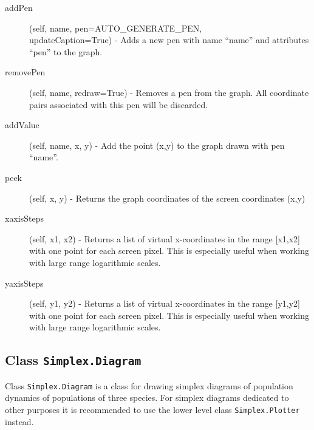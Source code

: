 \documentclass[12pt,a4paper,USenglish]{article}
\begin{document}
\begin{description}
\item[addPen](self, name, pen=AUTO\_GENERATE\_PEN,\\
  updateCaption=True) - Adds a new pen with name ``name'' and
  attributes ``pen'' to the graph.

\item[removePen](self, name, redraw=True) - Removes a pen from
        the graph. All coordinate pairs associated with this pen will
        be discarded.

\item[addValue](self, name, x, y) - Add the point (x,y) to the graph drawn with
	pen ``name''.

\item[peek](self, x, y) - Returns the graph coordinates of the screen 
	coordinates (x,y)

\item[xaxisSteps](self, x1, x2) - Returns a list of virtual x-coordinates 
	in the range [x1,x2] with one point for each screen pixel. This is
	especially useful when working with large range logarithmic scales.

\item[yaxisSteps](self, y1, y2) - Returns a list of virtual x-coordinates 
	in the range [y1,y2] with one point for each screen pixel.  This is
	especially useful when working with large range logarithmic scales.

\end{description}

\subsection{Class {\tt Simplex.Diagram}}

Class {\tt Simplex.Diagram} is a class for drawing simplex diagrams of
population dynamics of populations of three species. For simplex
diagrams dedicated to other purposes it is recommended to use the
lower level class {\tt Simplex.Plotter} instead.
\end{document}
